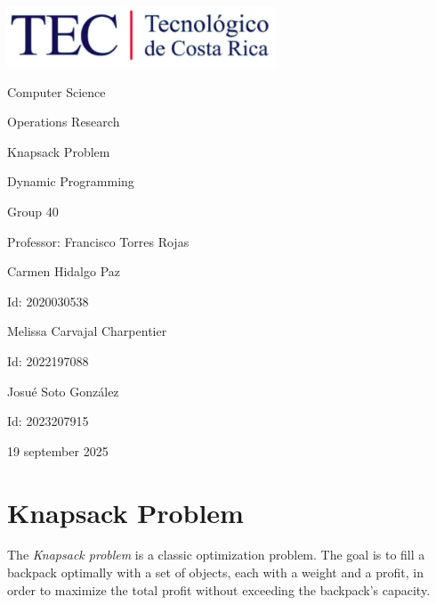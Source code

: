 \documentclass{article}
\begin{document}
\begin{titlepage}
    \centering
    \includegraphics[width=0.6\textwidth]{logo-tec.png}\par\vspace{1cm}

    {\large Computer Science\par}
    {\large Operations Research\par}
    \vspace{2cm}

    {\Large Knapsack Problem\par}
    {\large Dynamic Programming\par}
    \vspace{2cm}

    {\large Group 40\par}
    {\large Professor: Francisco Torres Rojas\par}
    \vspace{3cm}

    {\large Carmen Hidalgo Paz\par}
    {\large Id: 2020030538\par}
    \vspace{1cm}
    {\large Melissa Carvajal Charpentier\par}
    {\large Id: 2022197088\par}
    \vspace{1cm}
    {\large Josué Soto González\par}
    {\large Id: 2023207915\par}
    \vspace{1cm}

    {\large 19 september 2025\par}
\end{titlepage}

\newpage


\section{Knapsack Problem}
The \textit{Knapsack problem} is a classic optimization problem. The goal is to fill a backpack optimally with a set of objects, each with a weight and a profit, in order to maximize the total profit without exceeding the backpack's capacity.
\end{document}
